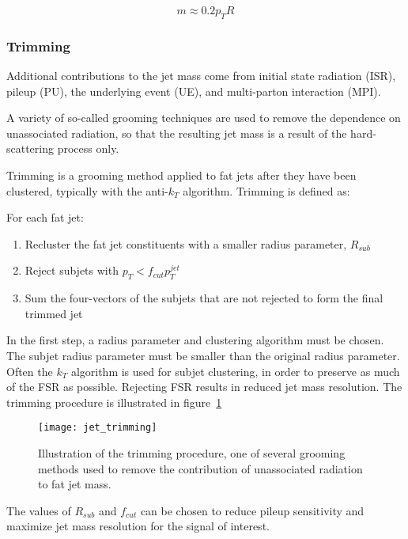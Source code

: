 \begin{equation}\label{eq:jet_mass_nlo}
    m \approx 0.2 p_T R
\end{equation}\cite{jet-mass-nlo}

\subsubsection{Trimming}

Additional contributions to the jet mass come from initial state radiation (ISR),
pileup (PU), the underlying event (UE), and multi-parton interaction (MPI).

A variety of so-called grooming techniques are used to remove the dependence on unassociated radiation,
so that the resulting jet mass is a result of the hard-scattering process only.

Trimming is a grooming method applied to fat jets after they have been clustered, typically with the anti-$k_T$ algorithm.
Trimming is defined as:

For each fat jet:
\begin{enumerate}
    \item Recluster the fat jet constituents with a smaller radius parameter, $R_{sub}$
    \item Reject subjets with $p_{T} < f_{cut} p_T^{jet}$
    \item Sum the four-vectors of the subjets that are not rejected to form the final trimmed jet
\end{enumerate}

In the first step, a radius parameter and clustering algorithm must be chosen.
The subjet radius parameter must be smaller than the original radius parameter.
Often the $k_T$ algorithm is used for subjet clustering, in order to preserve as much of the FSR as possible.
Rejecting FSR results in reduced jet mass resolution.\cite{jet-tasi-substructure}
The trimming procedure is illustrated in figure~\ref{fig:jet_trimming}

\begin{figure}[!ht]
    \centering
\texttt{[image: jet\_trimming]}
\caption{Illustration of the trimming procedure, one of several grooming methods used to remove the contribution
of unassociated radiation to fat jet mass.}
\label{fig:jet_trimming}
\end{figure}

The values of $R_{sub}$ and $f_{cut}$ can be chosen to reduce pileup sensitivity and maximize jet mass resolution for the signal of interest.

